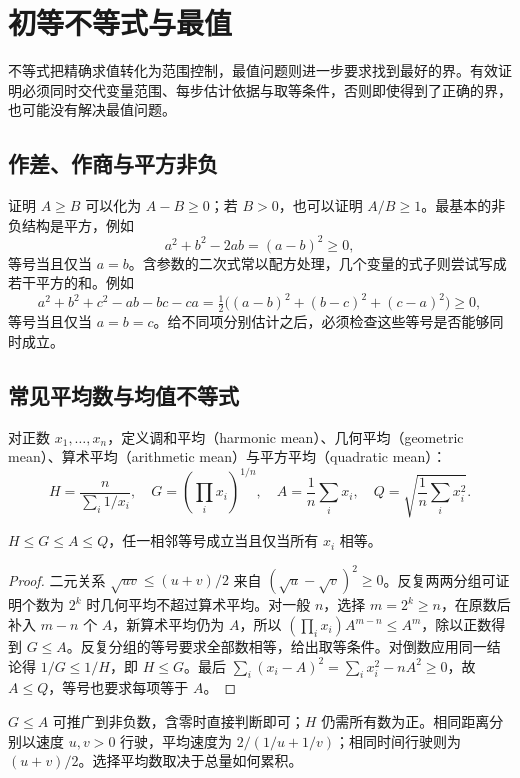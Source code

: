 \documentclass[UTF8]{ctexbook}
\begin{document}
\chapter{初等不等式与最值}
\label{chap:em-inequality-methods}
不等式把精确求值转化为范围控制，最值问题则进一步要求找到最好的界。有效证明必须同时交代变量范围、每步估计依据与取等条件，否则即使得到了正确的界，也可能没有解决最值问题。

\section{作差、作商与平方非负}
证明 $A\ge B$ 可以化为 $A-B\ge0$；若 $B>0$，也可以证明 $A/B\ge1$。最基本的非负结构是平方，例如
\[
 a^2+b^2-2ab=(a-b)^2\ge0,
\]
等号当且仅当 $a=b$。含参数的二次式常以配方处理，几个变量的式子则尝试写成若干平方的和。例如
\[
 a^2+b^2+c^2-ab-bc-ca
 =\tfrac12\bigl((a-b)^2+(b-c)^2+(c-a)^2\bigr)\ge0,
\]
等号当且仅当 $a=b=c$。给不同项分别估计之后，必须检查这些等号是否能够同时成立。

\section{常见平均数与均值不等式}
对正数 $x_1,\ldots,x_n$，定义调和平均（harmonic mean）、几何平均（geometric mean）、算术平均（arithmetic mean）与平方平均（quadratic mean）：
\[
 H=\frac n{\sum_i1/x_i},\quad G=\left(\prod_i x_i\right)^{1/n},
 \quad A=\frac1n\sum_i x_i,\quad Q=\sqrt{\frac1n\sum_i x_i^2}.
\]
\begin{theorem}[均值链]
$H\le G\le A\le Q$，任一相邻等号成立当且仅当所有 $x_i$ 相等。
\end{theorem}
\begin{proof}
二元关系 $\sqrt{uv}\le(u+v)/2$ 来自 $(\sqrt u-\sqrt v)^2\ge0$。反复两两分组可证明个数为 $2^k$ 时几何平均不超过算术平均。对一般 $n$，选择 $m=2^k\ge n$，在原数后补入 $m-n$ 个 $A$，新算术平均仍为 $A$，所以 $(\prod_i x_i)A^{m-n}\le A^m$，除以正数得到 $G\le A$。反复分组的等号要求全部数相等，给出取等条件。对倒数应用同一结论得 $1/G\le1/H$，即 $H\le G$。最后 $\sum_i(x_i-A)^2=\sum_i x_i^2-nA^2\ge0$，故 $A\le Q$，等号也要求每项等于 $A$。
\end{proof}
$G\le A$ 可推广到非负数，含零时直接判断即可；$H$ 仍需所有数为正。相同距离分别以速度 $u,v>0$ 行驶，平均速度为 $2/(1/u+1/v)$；相同时间行驶则为 $(u+v)/2$。选择平均数取决于总量如何累积。
\end{document}
